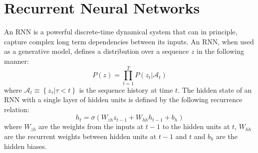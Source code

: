 \documentclass{article}
\begin{document}




\section{Recurrent Neural Networks}
\label{sec:format}
An RNN is a powerful discrete-time dynamical system that can in principle, capture complex long term dependencies between its inputs. An RNN, when used as a generative model, defines a distribution over a sequence $z$ in the following manner:
\begin{equation}
P(z) = \prod_{t=1}^{T} P(z_t|\mathcal A_t)
\end{equation} where $\mathcal A_t \equiv \left\{ z_{\tau} | \tau < t \right\}$ is the sequence history at time $t$. The hidden state of an RNN with a single layer of hidden units is defined by the following recurrence relation:
\begin{equation}
h_t = \sigma(W_{zh}z_{t-1} + W_{hh}h_{t-1} + b_{h})
\end{equation} where $W_{zh}$ are the weights from the inputs at $t-1$ to the hidden units at $t$, $W_{hh}$ are the recurrent weights between hidden units at $t-1$ and $t$ and $b_h$ are the hidden biases. 
\end{document}
